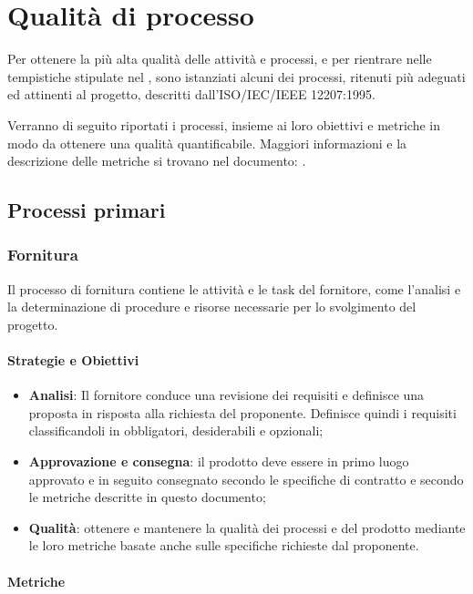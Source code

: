 \section{Qualità di processo}
Per ottenere la più alta qualità delle attività e processi, e per rientrare nelle tempistiche stipulate nel \PdP , sono istanziati alcuni dei processi, ritenuti più adeguati ed attinenti al progetto, descritti dall'ISO/IEC/IEEE 12207:1995.

Verranno di seguito riportati i processi, insieme ai loro obiettivi e metriche in modo da ottenere una qualità quantificabile. Maggiori informazioni e la descrizione delle metriche si trovano nel documento: \NdP .

    \subsection{Processi primari}
    
    
        \subsubsection{Fornitura}
        Il processo di fornitura contiene le attività e le task del fornitore, come l'analisi e la determinazione di procedure e risorse necessarie per lo svolgimento del progetto.
        
            \paragraph{Strategie e Obiettivi}
            \begin{itemize}
                \item \textbf{Analisi}: Il fornitore conduce una revisione dei requisiti e definisce una proposta in risposta alla richiesta del proponente. Definisce quindi i requisiti classificandoli in obbligatori, desiderabili e opzionali;
                \item \textbf{Approvazione e consegna}: il prodotto deve essere in primo luogo approvato e in seguito consegnato secondo le specifiche di contratto e secondo le metriche descritte in questo documento;
                \item \textbf{Qualità}: ottenere e mantenere la qualità dei processi e del prodotto mediante le loro metriche basate anche sulle specifiche richieste dal proponente.
            \end{itemize}
            
            
            \paragraph{Metriche}
            
